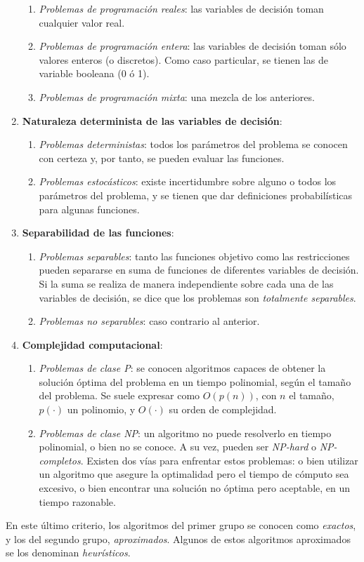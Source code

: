 \begin{enumerate}
        \begin{enumerate}
            \item {\sl Problemas de programación reales}: las variables de decisión toman cualquier valor real.
            \item {\sl Problemas de programación entera}: las variables de decisión toman sólo valores enteros (o discretos). Como caso particular, se tienen las de variable booleana (0 ó 1).
            \item {\sl Problemas de programación mixta}: una mezcla de los anteriores.
        \end{enumerate}
    \item {\bf Naturaleza determinista de las variables de decisión}:
        \begin{enumerate}
            \item {\sl Problemas deterministas}: todos los parámetros del problema se conocen con certeza y, por tanto, se pueden evaluar las funciones.
            \item {\sl Problemas estocásticos}: existe incertidumbre sobre alguno o todos los parámetros del problema, y se tienen que dar definiciones probabilísticas para algunas funciones.
        \end{enumerate}
    \item {\bf Separabilidad de las funciones}:
        \begin{enumerate}
            \item {\sl Problemas separables}: tanto las funciones objetivo como las restricciones pueden separarse en suma de funciones de diferentes variables de decisión. Si la suma se realiza de manera independiente sobre cada una de las variables de decisión, se dice que los problemas son {\sl totalmente separables}.
            \item {\sl Problemas no separables}: caso contrario al anterior.
        \end{enumerate}
    \item {\bf Complejidad computacional}:
        \begin{enumerate}
            \item {\sl Problemas de clase P}: se conocen algoritmos capaces de obtener la solución óptima del problema en un tiempo polinomial, según el tamaño del problema. Se suele expresar como $O(p(n))$, con $n$ el tamaño, $p(\cdot)$ un polinomio, y $O(\cdot)$ su orden de complejidad.
            \item {\sl Problemas de clase NP}: un algoritmo no puede resolverlo en tiempo polinomial, o bien no se conoce. A su vez, pueden ser {\sl NP-hard} o {\sl NP-completos}. Existen dos vías para enfrentar estos problemas: o bien utilizar un algoritmo que asegure la optimalidad pero el tiempo de cómputo sea excesivo, o bien encontrar una solución no óptima pero aceptable, en un tiempo razonable.
        \end{enumerate}
\end{enumerate}
En este último criterio, los algoritmos del primer grupo se conocen como {\sl exactos}, y los del segundo grupo, {\sl aproximados}. Algunos de estos algoritmos aproximados se los denominan {\sl heurísticos}.

